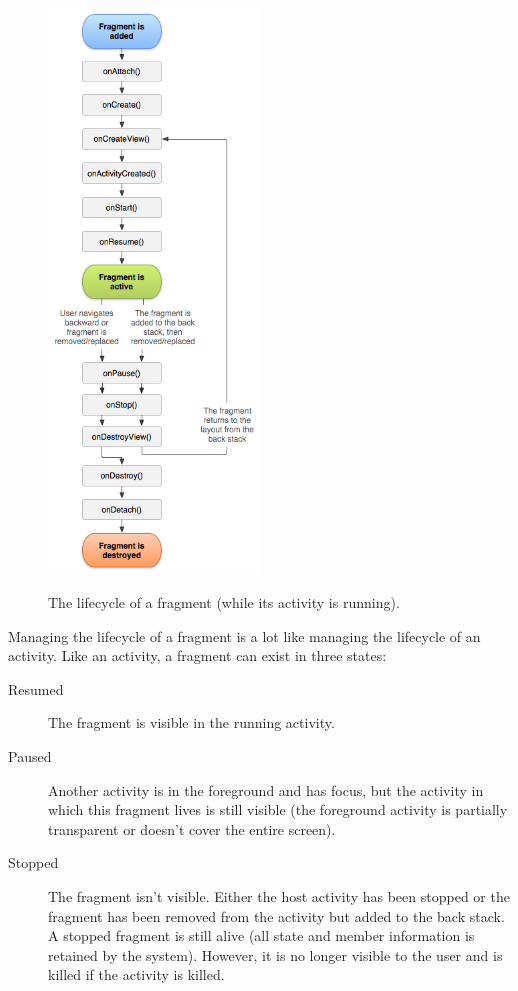 \begin{figure}
	\centering
	\includegraphics[width=0.5\textwidth]{images/fragments/lifecycle.png}
	\label{fig:fragcycle}
	\caption{The lifecycle of a fragment (while its activity is running).}
\end{figure}
Managing the lifecycle of a fragment is a lot like managing the lifecycle of an activity. Like an activity, a fragment can exist in three states:
\begin{description}
	\item[Resumed] The fragment is visible in the running activity.
	\item[Paused] Another activity is in the foreground and has focus, but the activity in which this fragment lives is still visible (the foreground activity is partially transparent or doesn't cover the entire screen).
	\item[Stopped] The fragment isn't visible. Either the host activity has been stopped or the fragment has been removed from the activity but added to the back stack. A stopped fragment is still alive (all state and member information is retained by the system). However, it is no longer visible to the user and is killed if the activity is killed.
\end{description}


